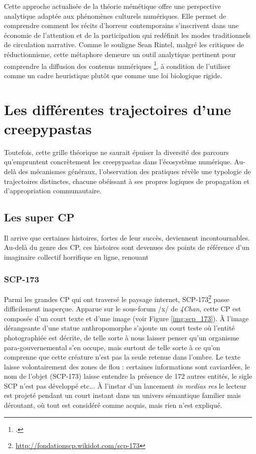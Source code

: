 \documentclass[12pt,a4paper,oneside,titlepage]{book} %
\begin{document}
Cette approche actualisée de la théorie mémétique offre une perspective analytique  adaptée aux phénomènes culturels numériques. Elle permet de comprendre comment les récits d'horreur contemporains s'inscrivent dans une économie de l'attention et de la participation qui redéfinit les modes traditionnels de circulation narrative. Comme le souligne Sean Rintel, malgré les critiques de réductionnisme, cette métaphore demeure un outil analytique pertinent pour comprendre la diffusion des contenus numériques \footcite[p.~255]{rintel_crisis_2013}, à condition de l'utiliser comme un cadre heuristique plutôt que comme une loi biologique rigide.


\section{Les différentes trajectoires d'une creepypastas}
Toutefois, cette grille théorique ne saurait épuiser la diversité des parcours qu'empruntent concrètement les creepypastas dans l'écosystème numérique. Au-delà des mécanismes généraux, l'observation des pratiques révèle une typologie de trajectoires distinctes, chacune obéissant à ses propres logiques de propagation et d'appropriation communautaire.
	\subsection{Les super CP}
    Il arrive que certaines histoires, fortes de leur succès, deviennent incontournables. Au-delà du genre des CP, ces histoires sont devenues des points de référence d'un imaginaire collectif horrifique en ligne, renouant 

    \subsubsection{SCP-173}
	
	Parmi les grandes CP qui ont traversé le paysage internet, SCP-173\footnote{\url{http://fondationscp.wikidot.com/scp-173}} passe difficilement inaperçue. Apparue sur le sous-forum /x/ de \emph{4Chan}, cette CP est composée d'un court texte et d'une image (voir Figure \ref{img:scp_173}). À l'image dérangeante d'une statue anthropomorphe s'ajoute un court teste où l'entité photographiée est décrite, de telle sorte à nous laisser penser qu'un organisme para-gouvernemental s'en occupe, mais surtout de telle sorte à ce qu’on comprenne que cette créature n'est pas la seule retenue dans l’ombre.  Le texte laisse volontairement des zones de flou : certaines informations sont caviardées, le nom de l'objet (SCP-173) laisse entendre la présence de 172 autres entités, le sigle \og SCP\fg{} n'est pas développé etc... À l'instar d'un lancement \textit{in medias res} le lecteur est projeté pendant un court instant dans un univers sémantique familier mais déroutant, où tout est considéré comme acquis, mais rien n'est expliqué.
\end{document}
